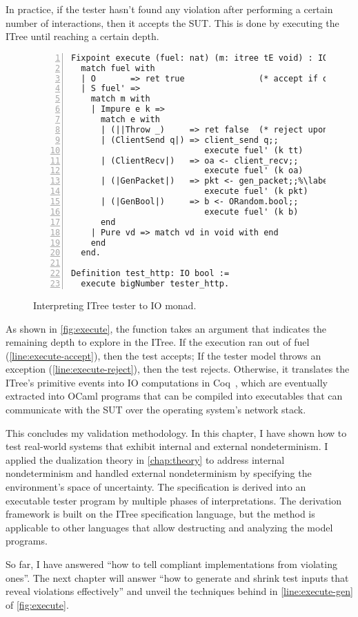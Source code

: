 In practice, if the tester hasn't found any violation after performing a certain
number of interactions, then it accepts the SUT.  This is done by executing the
ITree until reaching a certain depth.

\begin{figure}
\begin{lstlisting}[numbers=left]
Fixpoint execute (fuel: nat) (m: itree tE void) : IO bool :=
  match fuel with
  | O       => ret true               (* accept if out of fuel *)%\label{line:execute-accept}%
  | S fuel' =>
    match m with
    | Impure e k =>
      match e with
      | (||Throw _)     => ret false  (* reject upon exception *)%\label{line:execute-reject}%
      | (ClientSend q|) => client_send q;;
                           execute fuel' (k tt)
      | (ClientRecv|)   => oa <- client_recv;;
                           execute fuel' (k oa)
      | (|GenPacket|)   => pkt <- gen_packet;;%\label{line:execute-gen}%
                           execute fuel' (k pkt)
      | (|GenBool|)     => b <- ORandom.bool;;
                           execute fuel' (k b)
      end
    | Pure vd => match vd in void with end
    end
  end.

Definition test_http: IO bool :=
  execute bigNumber tester_http.
\end{lstlisting}
\caption{Interpreting ITree tester to IO monad.}
\label{fig:execute}
\end{figure}

As shown in \autoref{fig:execute}, the  function takes an
argument  that indicates the remaining depth to explore in the ITree.
If the execution ran out of fuel (\autoref{line:execute-accept}), then the test
accepts; If the tester model throws an exception
(\autoref{line:execute-reject}), then the test rejects.  Otherwise, it
translates the ITree's primitive events into IO computations in
Coq~\cite{SimpleIO}, which are eventually extracted into OCaml programs that can
be compiled into executables that can communicate with the SUT over the
operating system's network stack.

This concludes my validation methodology.  In this chapter, I have shown how to
test real-world systems that exhibit internal and external nondeterminism.  I
applied the dualization theory in \autoref{chap:theory} to address internal
nondeterminism and handled external nondeterminism by specifying the
environment's space of uncertainty.  The specification is derived into an
executable tester program by multiple phases of interpretations.  The
derivation framework is built on the ITree specification language, but the
method is applicable to other languages that allow destructing and analyzing the
model programs.

So far, I have answered ``how to tell compliant implementations from violating
ones''.  The next chapter will answer ``how to generate and shrink test inputs
that reveal violations effectively'' and unveil the techniques behind
 in \autoref{line:execute-gen} of \autoref{fig:execute}.

